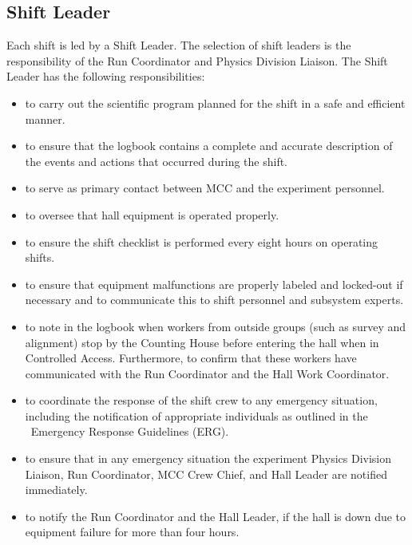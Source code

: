 \documentclass[11pt]{article}
\begin{document}
\subsection{Shift Leader}
\indent

Each shift is led by a Shift Leader. The selection of shift leaders
is the responsibility of the Run Coordinator and Physics Division Liaison.
The  Shift Leader has the following responsibilities: 

\begin{itemize}

\item to carry out the scientific program planned for the shift in a safe
and efficient manner.

\item to ensure that the logbook contains a complete and accurate
description of the events and actions that occurred during the shift.

\item to serve as primary contact between MCC and the
experiment personnel.

\item  to oversee that hall equipment is operated properly.

\item to ensure the shift checklist is performed every eight hours on operating
shifts.

\item to ensure that equipment malfunctions are properly labeled and
locked-out if necessary and to communicate this to shift personnel and 
subsystem experts.

 \item to note in the logbook when workers from outside groups (such as survey 
and alignment) stop by the Counting House before entering the hall when in 
Controlled Access. Furthermore, to confirm that these workers have
communicated with the Run Coordinator and the Hall Work Coordinator.

\item to coordinate the response of the shift crew to any
emergency situation, including the notification of appropriate individuals as
outlined in the \HALL\ Emergency Response Guidelines (ERG).

\item  to ensure that in any emergency situation the 
experiment Physics Division Liaison, Run Coordinator, MCC Crew Chief, and Hall Leader 
are notified immediately.

\item to notify the Run Coordinator and the Hall Leader, if the hall is down due to equipment failure for more than four hours.


\end{itemize}
\end{document}
